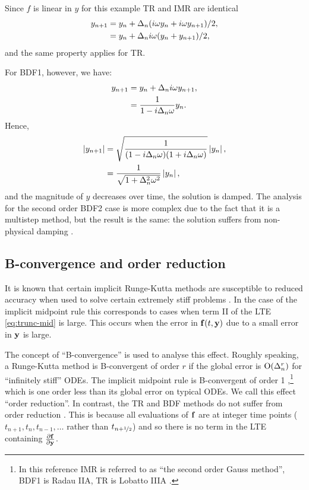 Since $f$ is linear in $y$ for this example TR and IMR are identical
\begin{equation}
  \begin{aligned}
    y_{n+1} &= y_n + \Delta_{n}(i\omega y_n + i\omega y_{n+1})/2, \\
    &= y_n + \Delta_{n} i \omega (y_n + y_{n+1})/2,
  \end{aligned}
\end{equation}
and the same property applies for TR.

For BDF1, however, we have:
\begin{equation}
  \begin{aligned}
    y_{n+1} &= y_n + \Delta_{n} i \omega y_{n+1}, \\
    &= \frac{1}{1 - i \Delta_{n} \omega} y_n.
  \end{aligned}
\end{equation}
Hence,
\begin{equation}
  \begin{aligned}
    \left|{y_{n+1}} \right| &= \sqrt{ \frac{1}{(1 - i \Delta_{n} \omega)(1 + i \Delta_{n} \omega)}} \left|{y_n} \right|, \\
    &= \frac{1}{\sqrt{1 + \Delta_{n}^2 \omega^2}} \left|{y_n} \right|, \\
  \end{aligned}
\end{equation}
and the magnitude of $y$ decreases over time, \ie the solution is damped.
The analysis for the second order BDF2 case is more complex due to the fact that it is a multistep method, but the result is the same: the solution suffers from non-physical damping \cite[265]{GreshoSani}.


\subsection{B-convergence and order reduction}
\label{sec:order-reduction}

It is known that certain implicit Runge-Kutta methods are susceptible to reduced accuracy when used to solve certain extremely stiff problems \cite[156]{Atkinson1994} \cite[225]{HairerWanner}.
In the case of the implicit midpoint rule this corresponds to cases when term II of the LTE \cref{eq:trunc-mid} is large.
This occurs when the error in ${\boldsymbol{\mathrm{f}}{\left( t, \boldsymbol{\mathrm{y}} \right)}}$ due to a small error in $\boldsymbol{\mathrm{y}}$ is large.

The concept of ``B-convergence'' is used to analyse this effect.
Roughly speaking, a Runge-Kutta method is B-convergent of order $r$ if the global error is $\mathrm{O}{\left( \Delta_{n}^r \right)}$ for ``infinitely stiff'' ODEs.
The implicit midpoint rule is B-convergent of order 1 \cite[231]{HairerWanner},\footnote{In this reference IMR is referred to as ``the second order Gauss method'', BDF1 is Radau IIA, TR is Lobatto IIIA \cite[72-76]{HairerWanner}.} which is one order less than its global error on typical ODEs.
We call this effect ``order reduction''.
In contrast, the TR and BDF methods do not suffer from order reduction \cite[159]{Atkinson1994}.
This is because all evaluations of ${\boldsymbol{\mathrm{f}}}$ are at integer time points (\ie $t_{n+1}, t_{n}, t_{n-1}, \ldots$ rather than $t_{n+\nicefrac{1}{2}}$) and so there is no term in the LTE containing $\frac{\partial {\boldsymbol{\mathrm{f}}}}{\partial \boldsymbol{\mathrm{y}}}$.

